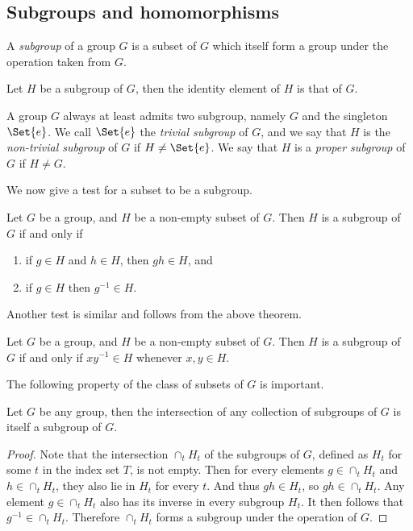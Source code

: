 \documentclass[main.tex]{subfiles}
\begin{document}
	\subsection{Subgroups and homomorphisms}
		\begin{definition}
			A \textit{subgroup} of a group $G$ is a subset of $G$ which itself form a group under the operation taken from $G$.
		\end{definition}
		\begin{theorem}
			Let $H$ be a subgroup of $G$, then the identity element of $H$ is that of $G$.
		\end{theorem}
	
		A group $G$ always at least admits two subgroup, namely $G$ and the singleton $\Set{e}$. We call $\Set{e}$ the \textit{trivial subgroup} of $G$, and we say that $H$ is the \textit{non-trivial subgroup} of $G$ if $H \neq \Set{e}$. We say that $H$ is a \textit{proper subgroup} of $G$ if $H \neq G$.
		
		We now give a test for a subset to be a subgroup.
		
		\begin{theorem}
			Let $G$ be a group, and $H$ be a non-empty subset of $G$. Then $H$ is a subgroup of $G$ if and only if
			\begin{enumerate}
				\item if $g \in H$ and $h \in H$, then $gh \in H$, and
				\item if $g \in H$ then $g^{-1} \in H$.
			\end{enumerate}
		\end{theorem}
		
		Another test is similar and follows from the above theorem.
		\begin{theorem}
			Let $G$ be a group, and $H$ be a non-empty subset of $G$. Then $H$ is a subgroup of $G$ if and only if $xy^{-1} \in H$ whenever $x,y \in H$.
		\end{theorem}
		
			The following property of the class of subsets of $G$ is important.
		\begin{theorem}
			Let $G$ be any group, then the intersection of any collection of subgroups of $G$ is itself a subgroup of $G$.
		\end{theorem}
			\begin{proof}
				Note that the intersection $\cap_t H_t$ of the subgroups of $G$, defined as $H_t$ for some $t$ in the index set $T$, is not empty. Then for every elements $g \in \cap_t H_t$ and $h \in \cap_t H_t$, they also lie in $H_t$ for every $t$. And thus $gh \in H_t$, so $gh \in \cap_t H_t$. Any element $g \in \cap_t H_t$ also has its inverse in every subgroup $H_t$. It then follows that $g^{-1} \in \cap_t H_t$. Therefore $\cap_t H_t$ forms a subgroup under the operation of $G$.
			\end{proof}
		
\end{document}
